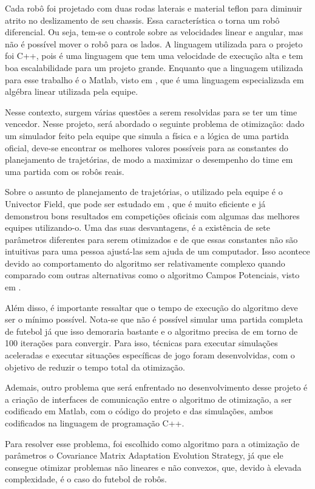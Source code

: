 \documentclass[10pt,fleqn,a4paper]{article}
\begin{document}
Cada robô foi projetado com duas rodas laterais e material teflon para diminuir atrito no deslizamento de seu chassis. Essa característica o torna um robô diferencial. Ou seja, tem-se o controle sobre as velocidades linear e angular, mas não é possível mover o robô para os lados. A linguagem utilizada para o projeto foi C++, pois é uma linguagem que tem uma velocidade de execução alta e tem boa escalabilidade para um projeto grande. Enquanto que a linguagem utilizada para esse trabalho é o Matlab, visto em \cite{matlab}, que é uma linguagem especializada em algébra linear utilizada pela equipe. 

Nesse contexto, surgem várias questões a serem resolvidas para se ter um time vencedor. Nesse projeto, será abordado o seguinte problema de otimização: dado um simulador feito pela equipe que simula a física e a lógica de uma partida oficial, deve-se encontrar os melhores valores possíveis para as constantes do planejamento de trajetórias, de modo a maximizar o desempenho do time em uma partida com os robôs reais.

Sobre o assunto de planejamento de trajetórias, o utilizado pela equipe é o Univector Field, que pode ser estudado em \cite{univector}, que é muito eficiente e já demonstrou bons resultados em competições oficiais com algumas das melhores equipes utilizando-o. Uma das suas desvantagens, é a existência de sete parâmetros diferentes para serem otimizados e de que essas constantes não são intuitivas para uma pessoa ajustá-las sem ajuda de um computador. Isso acontece devido ao comportamento do algoritmo ser relativamente complexo quando comparado com outras alternativas como o algoritmo Campos Potenciais, visto em \cite{potential_fields}.

Além disso, é importante ressaltar que o tempo de execução do algoritmo deve ser o mínimo possível. Nota-se que não é possível simular uma partida completa de futebol já que isso demoraria bastante e o algoritmo precisa de em torno de 100 iterações para convergir. Para isso, técnicas para executar simulações aceleradas e executar situações específicas de jogo foram desenvolvidas, com o objetivo de reduzir o tempo total da otimização.

Ademais, outro problema que será enfrentado no desenvolvimento desse projeto é a criação de interfaces de comunicação entre o algoritmo de otimização, a ser codificado em Matlab, com o código do projeto e das simulações, ambos codificados na linguagem de programação C++.

Para resolver esse problema, foi escolhido como algoritmo para a otimização de parâmetros o Covariance Matrix Adaptation Evolution Strategy, já que ele consegue otimizar problemas não lineares e não convexos, que, devido à elevada complexidade, é o caso do futebol de robôs.
\end{document}
